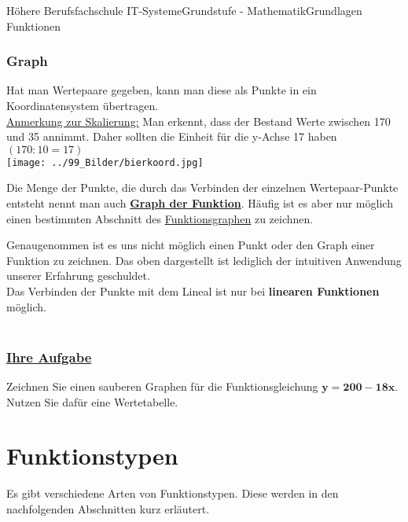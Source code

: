 \documentclass[11pt,twocolumn,oneside,openany,headings=optiontotoc,11pt,numbers=noenddot]{article}
\begin{document}
\begin{worksheet}{Höhere Berufsfachschule IT-Systeme}{Grundstufe - Mathematik}{Grundlagen Funktionen}
		\subsubsection*{Graph}
		Hat man Wertepaare gegeben, kann man diese als Punkte in ein Koordinatensystem übertragen.\\
		\underline{Anmerkung zur Skalierung:} Man erkennt, dass der Bestand Werte zwischen 170 und 35 annimmt. Daher sollten die Einheit für die y-Achse 17 haben \((170:10 = 17)\)\\
		\texttt{[image: ../99\_Bilder/bierkoord.jpg]}\\
		\par\bigskip\noindent
		Die Menge der Punkte, die durch das Verbinden der einzelnen Wertepaar-Punkte entsteht nennt man auch \underline{\textbf{Graph der Funktion}}. Häufig ist es aber nur möglich einen bestimmten Abschnitt des \underline{Funktionsgraphen} zu zeichnen.\\
		\par\bigskip\noindent
		Genaugenommen ist es uns nicht möglich einen Punkt oder den Graph einer Funktion zu zeichnen. Das oben dargestellt ist lediglich der intuitiven Anwendung unserer Erfahrung geschuldet.\\
		Das Verbinden der Punkte mit dem Lineal ist nur bei \textbf{linearen Funktionen} möglich.\\
		\textit{\color{red}{Im Allgemeinen gilt: Das Verwenden des Lineals zum Verbinden der Punkte ist streng verboten!}}\\
		\subsubsection*{\underline{Ihre Aufgabe}}
		Zeichnen Sie einen sauberen Graphen für die Funktionsgleichung \(\mathbf{y = 200-18x}\).\\
		Nutzen Sie dafür eine Wertetabelle.
		\newpage
		\section{Funktionstypen}
		Es gibt verschiedene Arten von Funktionstypen. Diese werden in den nachfolgenden Abschnitten kurz erläutert.

\end{worksheet}
\end{document}
